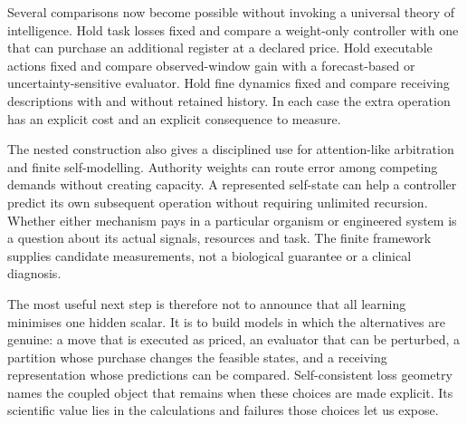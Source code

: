 Several comparisons now become possible without invoking a universal theory of intelligence. Hold task losses fixed and compare a weight-only controller with one that can purchase an additional register at a declared price. Hold executable actions fixed and compare observed-window gain with a forecast-based or uncertainty-sensitive evaluator. Hold fine dynamics fixed and compare receiving descriptions with and without retained history. In each case the extra operation has an explicit cost and an explicit consequence to measure.

The nested construction also gives a disciplined use for attention-like arbitration and finite self-modelling. Authority weights can route error among competing demands without creating capacity. A represented self-state can help a controller predict its own subsequent operation without requiring unlimited recursion. Whether either mechanism pays in a particular organism or engineered system is a question about its actual signals, resources and task. The finite framework supplies candidate measurements, not a biological guarantee or a clinical diagnosis.

The most useful next step is therefore not to announce that all learning minimises one hidden scalar. It is to build models in which the alternatives are genuine: a move that is executed as priced, an evaluator that can be perturbed, a partition whose purchase changes the feasible states, and a receiving representation whose predictions can be compared. Self-consistent loss geometry names the coupled object that remains when these choices are made explicit. Its scientific value lies in the calculations and failures those choices let us expose.
